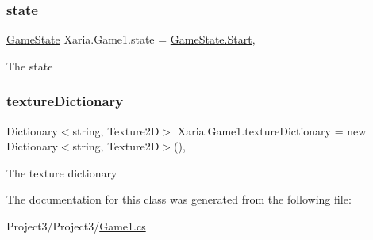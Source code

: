 \subsubsection{\texorpdfstring{state}{state}}
{\footnotesize\ttfamily \hyperlink{namespaceXaria_a2c2420c982c39ab01bdb72f1d7d4aac7}{Game\+State} Xaria.\+Game1.\+state = \hyperlink{namespaceXaria_a2c2420c982c39ab01bdb72f1d7d4aac7aa6122a65eaa676f700ae68d393054a37}{Game\+State.\+Start}\hspace{0.3cm}{\ttfamily [static]}, {\ttfamily [package]}}



The state 

\mbox{\label{classXaria_1_1Game1_a4b450443afb4c333b7c1e4f52beaebb8}} 
\subsubsection{\texorpdfstring{texture\+Dictionary}{textureDictionary}}
{\footnotesize\ttfamily Dictionary$<$string, Texture2D$>$ Xaria.\+Game1.\+texture\+Dictionary = new Dictionary$<$string, Texture2D$>$()\hspace{0.3cm}{\ttfamily [static]}, {\ttfamily [package]}}



The texture dictionary 



The documentation for this class was generated from the following file\+:\begin{DoxyCompactItemize}
\item 
Project3/\+Project3/\hyperlink{Game1_8cs}{Game1.\+cs}\end{DoxyCompactItemize}
